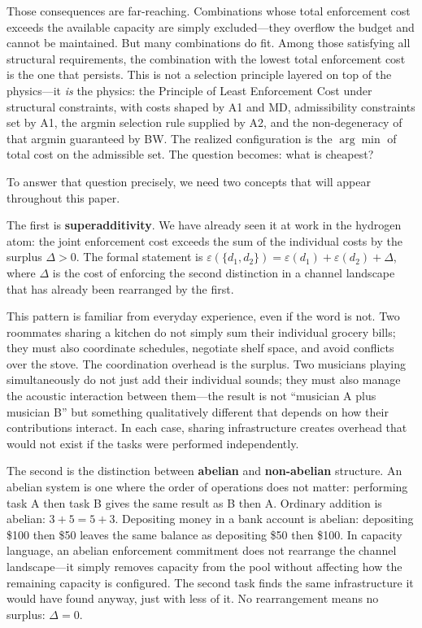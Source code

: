 \documentclass[11pt]{article}
\begin{document}
Those consequences are far-reaching.  Combinations whose total enforcement cost exceeds the available capacity are simply excluded---they overflow the budget and cannot be maintained.  But many combinations do fit.  Among those satisfying all structural requirements, the combination with the lowest total enforcement cost is the one that persists.  This is not a selection principle layered on top of the physics---it \emph{is} the physics: the Principle of Least Enforcement Cost under structural constraints, with costs shaped by A1 and MD, admissibility constraints set by A1, the argmin selection rule supplied by A2, and the non-degeneracy of that argmin guaranteed by BW.  The realized configuration is the $\arg\min$ of total cost on the admissible set.  The question becomes: what is cheapest?

To answer that question precisely, we need two concepts that will appear throughout this paper.

The first is \textbf{superadditivity}.  We have already seen it at work in the hydrogen atom: the joint enforcement cost exceeds the sum of the individual costs by the surplus $\Delta > 0$.  The formal statement is $\varepsilon(\{d_1, d_2\}) = \varepsilon(d_1) + \varepsilon(d_2) + \Delta$, where $\Delta$ is the cost of enforcing the second distinction in a channel landscape that has already been rearranged by the first.

This pattern is familiar from everyday experience, even if the word is not.  Two roommates sharing a kitchen do not simply sum their individual grocery bills; they must also coordinate schedules, negotiate shelf space, and avoid conflicts over the stove.  The coordination overhead is the surplus.  Two musicians playing simultaneously do not just add their individual sounds; they must also manage the acoustic interaction between them---the result is not ``musician A plus musician B'' but something qualitatively different that depends on how their contributions interact.  In each case, sharing infrastructure creates overhead that would not exist if the tasks were performed independently.

The second is the distinction between \textbf{abelian} and \textbf{non-abelian} structure.  An abelian system is one where the order of operations does not matter: performing task A then task B gives the same result as B then A.  Ordinary addition is abelian: $3 + 5 = 5 + 3$.  Depositing money in a bank account is abelian: depositing \$100 then \$50 leaves the same balance as depositing \$50 then \$100.  In capacity language, an abelian enforcement commitment does not rearrange the channel landscape---it simply removes capacity from the pool without affecting how the remaining capacity is configured.  The second task finds the same infrastructure it would have found anyway, just with less of it.  No rearrangement means no surplus: $\Delta = 0$.
\end{document}
